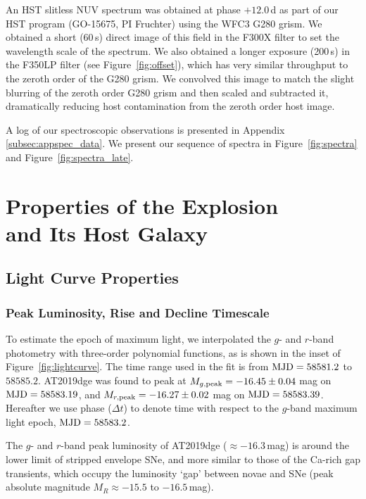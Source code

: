 \documentclass[twocolumn]{aastex63}
\begin{document}
\begin{CJK*}{UTF8}{gbsn}
An HST slitless NUV spectrum was obtained at phase $+12.0$\,d as part of our HST program 
(GO-15675, PI Fruchter) using the WFC3 G280 grism. We obtained a short (60\,s) direct image of this 
field in the F300X filter to  set  the wavelength scale of the  spectrum. We also obtained  a longer 
exposure (200\,s) in the F350LP filter (see Figure~\ref{fig:offset}), which has very similar throughput to 
the zeroth order of the G280 grism. We convolved this image to match the slight blurring of the 
zeroth order G280 grism and then scaled and subtracted it, dramatically reducing host contamination 
from the zeroth order host image.

A log of our spectroscopic observations is presented in Appendix \ref{subsec:appspec_data}. We 
present our sequence of spectra in Figure~\ref{fig:spectra} and Figure~\ref{fig:spectra_late}.

\section{Properties of the Explosion \\and Its Host Galaxy}
\subsection{Light Curve Properties}\label{subsec:lc_properties}

\subsubsection{Peak Luminosity, Rise and Decline Timescale}
To estimate the epoch of maximum light, we interpolated the $g$- and $r$-band photometry with 
three-order polynomial functions, as is shown in the inset of Figure~\ref{fig:lightcurve}. The time range 
used in the fit is from ${\rm MJD}=58581.2$ to $58585.2$. AT2019dge was found to peak 
at $M_{g\rm , peak}=-16.45\pm0.04$ mag on ${\rm MJD}=58583.19$, and $M_{r \rm ,peak } 
=-16.27\pm0.02$ mag on ${\rm MJD}=58583.39$. Hereafter we use phase ($\Delta t$) to denote time
with respect to the $g$-band maximum light epoch, ${\rm MJD}=58583.2$.

The $g$- and $r$-band peak luminosity of AT2019dge ($\approx -16.3$\,mag) is around the lower limit 
of stripped envelope SNe, and more similar to those of the Ca-rich gap transients, 
which occupy the luminosity `gap' between novae and SNe (peak absolute magnitude $M_R \approx 
-15.5$ to $-16.5$\,mag).


\end{CJK*}
\end{document}
